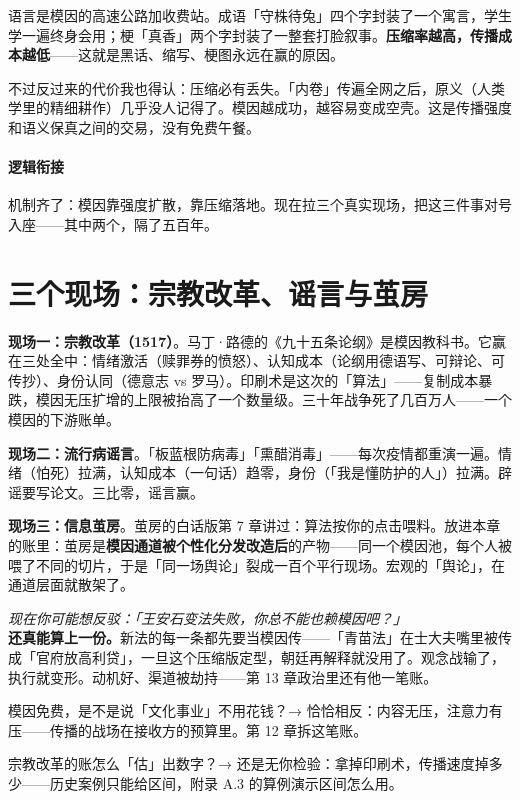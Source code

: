 \documentclass[../../main2.tex]{subfiles}
\begin{document}
语言是模因的高速公路加收费站。成语「守株待兔」四个字封装了一个寓言，学生学一遍终身会用；梗「真香」两个字封装了一整套打脸叙事。\textbf{压缩率越高，传播成本越低}——这就是黑话、缩写、梗图永远在赢的原因。

不过反过来的代价我也得认：压缩必有丢失。「内卷」传遍全网之后，原义（人类学里的精细耕作）几乎没人记得了。模因越成功，越容易变成空壳。这是传播强度和语义保真之间的交易，没有免费午餐。

\paragraph*{逻辑衔接}
	机制齐了：模因靠强度扩散，靠压缩落地。现在拉三个真实现场，把这三件事对号入座——其中两个，隔了五百年。

\section{三个现场：宗教改革、谣言与茧房}

\textbf{现场一：宗教改革（1517）}。马丁·路德的《九十五条论纲》是模因教科书。它赢在三处全中：情绪激活（赎罪券的愤怒）、认知成本（论纲用德语写、可辩论、可传抄）、身份认同（德意志 vs 罗马）。印刷术是这次的「算法」——复制成本暴跌，模因无压扩增的上限被抬高了一个数量级。三十年战争死了几百万人——一个模因的下游账单。

\textbf{现场二：流行病谣言}。「板蓝根防病毒」「熏醋消毒」——每次疫情都重演一遍。情绪（怕死）拉满，认知成本（一句话）趋零，身份（「我是懂防护的人」）拉满。辟谣要写论文。三比零，谣言赢。

\textbf{现场三：信息茧房}。茧房的白话版第 7 章讲过：算法按你的点击喂料。放进本章的账里：茧房是\textbf{模因通道被个性化分发改造后}的产物——同一个模因池，每个人被喂了不同的切片，于是「同一场舆论」裂成一百个平行现场。宏观的「舆论」，在通道层面就散架了。

\begin{questionbox}
	\textit{现在你可能想反驳：「王安石变法失败，你总不能也赖模因吧？」}\\
	\textbf{还真能算上一份。}新法的每一条都先要当模因传——「青苗法」在士大夫嘴里被传成「官府放高利贷」，一旦这个压缩版定型，朝廷再解释就没用了。观念战输了，执行就变形。动机好、渠道被劫持——第 13 章政治里还有他一笔账。
\end{questionbox}

\begin{reader_anticipation}
	\item 模因免费，是不是说「文化事业」不用花钱？→ 恰恰相反：内容无压，注意力有压——传播的战场在接收方的预算里。第 12 章拆这笔账。
	\item 宗教改革的账怎么「估」出数字？→ 还是无你检验：拿掉印刷术，传播速度掉多少——历史案例只能给区间，附录 A.3 的算例演示区间怎么用。
\end{reader_anticipation}
\end{document}
